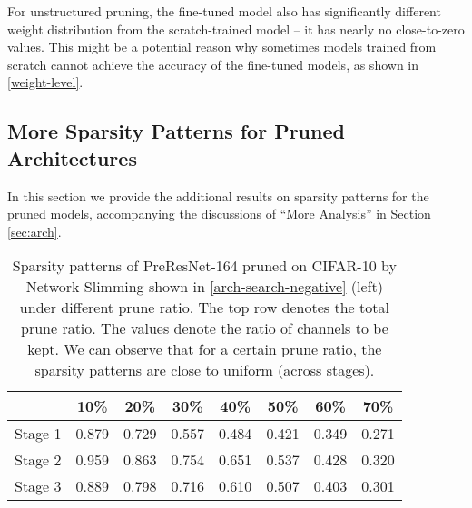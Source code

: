 For unstructured pruning, the fine-tuned model also has significantly different weight distribution from the scratch-trained model -- it has nearly no close-to-zero values. This might be a potential reason why sometimes  models trained from scratch cannot achieve the accuracy of the fine-tuned models, as shown in \autoref{weight-level}.

\subsection{More Sparsity Patterns for Pruned Architectures}
\label{sec:additional}
In this section we provide the additional results on sparsity patterns for the pruned models, accompanying the discussions of ``More Analysis'' in Section \ref{sec:arch}.

\setlength{\tabcolsep}{5pt}
\renewcommand{\arraystretch}{1.2}
\begin{table}[!htbp]
\centering
\small
\begin{tabular}{c|ccccccc}
\hline
       & 10\%   & 20\%   & 30\%   & 40\%   & 50\%   & 60\%   & 70\%   \\ \hline
Stage 1 & 0.879 & 0.729 & 0.557 & 0.484 & 0.421 & 0.349 & 0.271 \\
Stage 2 & 0.959 & 0.863 & 0.754 & 0.651 & 0.537 & 0.428 & 0.320 \\
Stage 3 & 0.889 & 0.798 & 0.716 & 0.610 & 0.507 & 0.403 & 0.301 \\ \hline
\end{tabular}
  \caption{
      Sparsity patterns of PreResNet-164 pruned on CIFAR-10 by Network Slimming  shown in \autoref{arch-search-negative} (left) under different prune ratio. The top row denotes the total prune ratio. The values denote the ratio of channels to be kept. We can observe that for a certain prune ratio, the sparsity patterns are close to uniform (across stages).}
      \label{sparsity-5}
\end{table}


